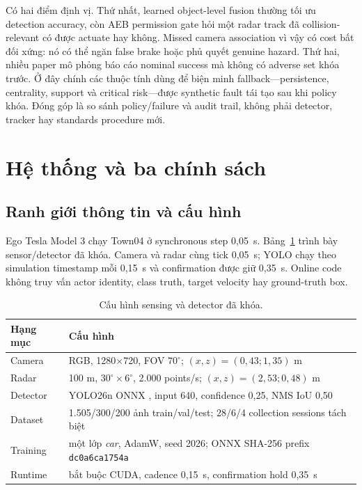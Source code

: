 \documentclass[conference]{IEEEtran}
\begin{document}
Có hai điểm định vị. Thứ nhất, learned object-level fusion thường tối ưu detection
accuracy, còn AEB permission gate hỏi một radar track đã collision-relevant có
được actuate hay không. Missed camera association vì vậy có cost bất đối xứng:
nó có thể ngăn false brake hoặc phủ quyết genuine hazard. Thứ hai, nhiều paper mô
phỏng báo cáo nominal success mà không có adverse set khóa trước. Ở đây chính các
thuộc tính dùng để biện minh fallback---persistence, centrality, support và
critical risk---được synthetic fault tái tạo sau khi policy khóa. Đóng góp là so
sánh policy/failure và audit trail, không phải detector, tracker hay standards
procedure mới.

\section{Hệ thống và ba chính sách}
\subsection{Ranh giới thông tin và cấu hình}
Ego Tesla Model 3 chạy Town04 ở synchronous step 0,05~s. Bảng~\ref{tab:setup}
trình bày sensor/detector đã khóa. Camera và radar cùng tick 0,05~s; YOLO chạy
theo simulation timestamp mỗi 0,15~s và confirmation được giữ 0,35~s. Online
code không truy vấn actor identity, class truth, target velocity hay ground-truth
box.

\begin{table}[t]
\caption{Cấu hình sensing và detector đã khóa.}
\label{tab:setup}
\centering\scriptsize
\setlength{\tabcolsep}{3pt}
\begin{tabular}{p{}p{}}
\toprule Hạng mục & Cấu hình\\ \midrule
Camera & RGB, 1280$\times$720, FOV $70^\circ$; $(x,z)=(0,43;1,35)$ m\\
Radar & 100 m, $30^\circ\!\times6^\circ$, 2.000 points/s; $(x,z)=(2,53;0,48)$ m\\
Detector & YOLO26n ONNX \cite{ultralytics_yolo}, input 640, confidence 0,25, NMS IoU 0,50\\
Dataset & 1.505/300/200 ảnh train/val/test; 28/6/4 collection sessions tách biệt\\
Training & một lớp \emph{car}, AdamW, seed 2026; ONNX SHA-256 prefix \texttt{dc0a6ca1754a}\\
Runtime & bắt buộc CUDA, cadence 0,15~s, confirmation hold 0,35~s\\
\bottomrule
\end{tabular}
\end{table}
\end{document}
